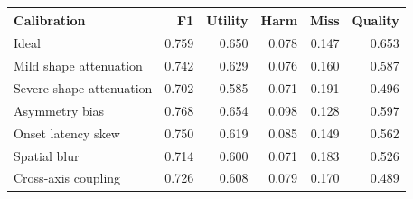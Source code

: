 \begin{tabular}{lrrrrr}
\toprule
Calibration & F1 & Utility & Harm & Miss & Quality \\
\midrule
Ideal & 0.759 & 0.650 & 0.078 & 0.147 & 0.653 \\
Mild shape attenuation & 0.742 & 0.629 & 0.076 & 0.160 & 0.587 \\
Severe shape attenuation & 0.702 & 0.585 & 0.071 & 0.191 & 0.496 \\
Asymmetry bias & 0.768 & 0.654 & 0.098 & 0.128 & 0.597 \\
Onset latency skew & 0.750 & 0.619 & 0.085 & 0.149 & 0.562 \\
Spatial blur & 0.714 & 0.600 & 0.071 & 0.183 & 0.526 \\
Cross-axis coupling & 0.726 & 0.608 & 0.079 & 0.170 & 0.489 \\
\bottomrule
\end{tabular}
